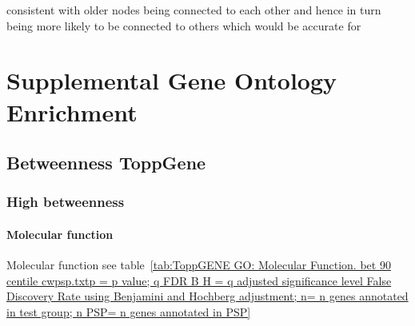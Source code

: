 consistent with older nodes being connected to each other and hence in turn being more likely to be connected to others which would be accurate for














































\section{Supplemental Gene Ontology Enrichment}
\subsection{Betweenness ToppGene}
\subsubsection{High betweenness}
\paragraph{Molecular function}
Molecular function see table~\ref{tab:ToppGENE GO: Molecular Function. bet 90 centile cwpsp.txtp = p value; q FDR B H = q adjusted significance level False Discovery Rate using Benjamini and Hochberg adjustment; n= n genes annotated in test group; n PSP= n genes annotated in PSP}


